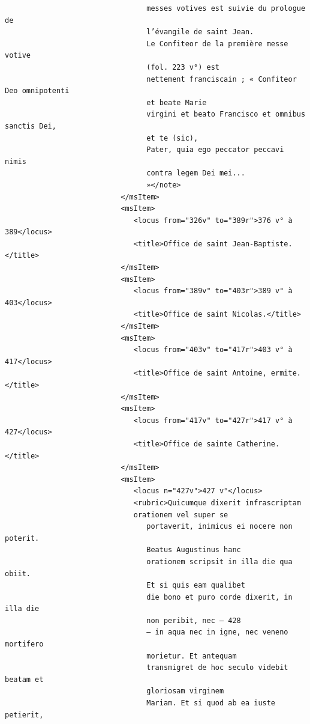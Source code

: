 \documentclass[a4paper,12pt,twoside]{book}
\begin{document}
\begin{verbatim}
                                 messes votives est suivie du prologue de 
                                 l’évangile de saint Jean.
                                 Le Confiteor de la première messe votive 
                                 (fol. 223 v°) est
                                 nettement franciscain ; « Confiteor Deo omnipotenti
                                 et beate Marie
                                 virgini et beato Francisco et omnibus sanctis Dei,
                                 et te (sic),
                                 Pater, quia ego pecca­tor peccavi nimis 
                                 contra legem Dei mei...
                                 »</note>
                           </msItem>
                           <msItem>
                              <locus from="326v" to="389r">376 v° à 389</locus>
                              <title>Office de saint Jean-Baptiste.</title>
                           </msItem>
                           <msItem>
                              <locus from="389v" to="403r">389 v° à 403</locus>
                              <title>Office de saint Nicolas.</title>
                           </msItem>
                           <msItem>
                              <locus from="403v" to="417r">403 v° à 417</locus>
                              <title>Office de saint Antoine, ermite.</title>
                           </msItem>
                           <msItem>
                              <locus from="417v" to="427r">417 v° à 427</locus>
                              <title>Office de sainte Catherine.</title>
                           </msItem>
                           <msItem>
                              <locus n="427v">427 v°</locus>
                              <rubric>Quicumque dixerit infrascriptam 
                              orationem vel super se
                                 portaverit, inimicus ei nocere non poterit.
                                 Beatus Augustinus hanc
                                 orationem scripsit in illa die qua obiit. 
                                 Et si quis eam qualibet
                                 die bono et puro corde dixerit, in illa die
                                 non peribit, nec — 428
                                 — in aqua nec in igne, nec veneno mortifero 
                                 morietur. Et antequam
                                 transmigret de hoc seculo videbit beatam et 
                                 gloriosam virginem
                                 Mariam. Et si quod ab ea iuste petierit, 

\end{verbatim}
\end{document}
